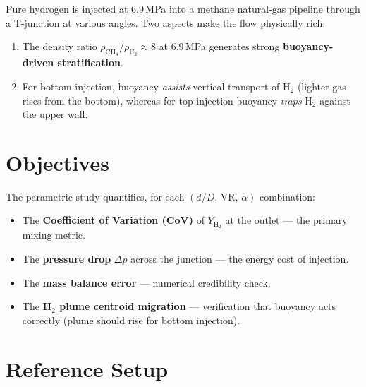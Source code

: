 \documentclass[12pt,a4paper]{report}
\begin{document}
Pure hydrogen is injected at 6.9\,MPa into a methane natural-gas
pipeline through a T-junction at various angles.  Two aspects make
the flow physically rich:

\begin{enumerate}
  \item The density ratio $\rho_{\mathrm{CH_4}}/\rho_{\mathrm{H_2}}
        \approx 8$ at 6.9\,MPa generates strong
        \textbf{buoyancy-driven stratification}.
  \item For bottom injection, buoyancy \emph{assists} vertical
        transport of H$_2$ (lighter gas rises from the bottom),
        whereas for top injection buoyancy \emph{traps} H$_2$ against
        the upper wall.
\end{enumerate}

\section{Objectives}

The parametric study quantifies, for each $(d/D,\,\mathrm{VR},\,\alpha)$
combination:

\begin{itemize}
  \item The \textbf{Coefficient of Variation (CoV)} of $Y_{\mathrm{H_2}}$
        at the outlet --- the primary mixing metric.
  \item The \textbf{pressure drop} $\Delta p$ across the junction ---
        the energy cost of injection.
  \item The \textbf{mass balance error} --- numerical credibility check.
  \item The \textbf{H$_2$ plume centroid migration} --- verification that
        buoyancy acts correctly (plume should rise for bottom injection).
\end{itemize}

\section{Reference Setup}
\end{document}
